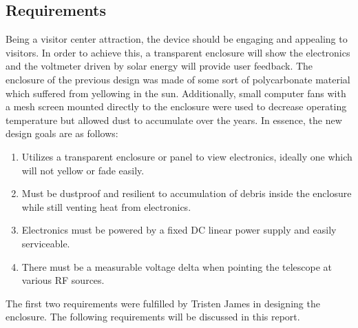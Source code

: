 \documentclass[titlepage]{article}
\begin{document}
\subsection{Requirements}
Being a visitor center attraction, the device should be engaging and appealing to visitors. In order to achieve this, a transparent enclosure will show the electronics and the voltmeter driven by solar energy will provide user feedback. The enclosure of the previous design was made of some sort of polycarbonate material which suffered from yellowing in the sun. Additionally, small computer fans with a mesh screen mounted directly to the enclosure were used to decrease operating temperature but allowed dust to accumulate over the years. In essence, the new design goals are as follows:
\begin{enumerate}
    \item Utilizes a transparent enclosure or panel to view electronics, ideally one which will not yellow or fade easily.
    \item Must be dustproof and resilient to accumulation of debris inside the enclosure while still venting heat from electronics.
    \item Electronics must be powered by a fixed DC linear power supply and easily serviceable.
    \item There must be a measurable voltage delta when pointing the telescope at various RF sources.
\end{enumerate}
The first two requirements were fulfilled by Tristen James in designing the enclosure. The following requirements will be discussed in this report.
\end{document}
